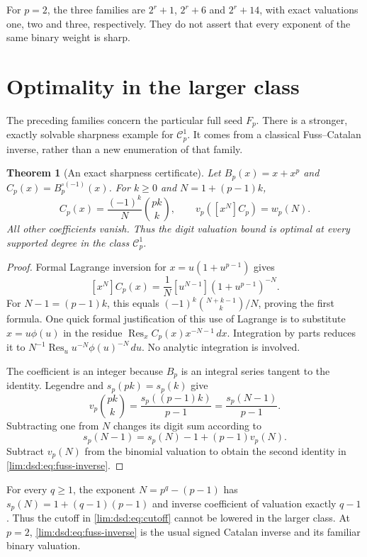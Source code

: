\documentclass[11pt]{article}
\newtheorem{theorem}{Theorem}[section]
\theoremstyle{definition}
\theoremstyle{remark}
\newcommand{\Cp}{\mathcal C_p}
\begin{document}
For $p=2$, the three families are $2^r+1$, $2^r+6$ and $2^r+14$,
with exact valuations one, two and three, respectively. They do not
assert that every exponent of the same binary weight is sharp.

\section{Optimality in the larger class}
\label{lim:dsd:sec:sharpness}

The preceding families concern the particular full seed $F_p$.
There is a stronger, exactly solvable sharpness example for $\Cp^1$.
It comes from a classical Fuss--Catalan inverse, rather than a new
enumeration of that family.

\begin{theorem}[An exact sharpness certificate]
\label{lim:dsd:thm:inverse-sharp}
Let $B_p(x)=x+x^p$ and $C_p(x)=B_p^{\circ(-1)}(x)$. For
$k\ge0$ and $N=1+(p-1)k$,
\begin{equation}
 [x^N]C_p(x)=\frac{(-1)^k}{N}\binom{pk}{k},
 \qquad
 v_p([x^N]C_p)=w_p(N).
 \label{lim:dsd:eq:fuss-inverse}
\end{equation}
All other coefficients vanish. Thus the digit valuation bound is
optimal at every supported degree in the class $\Cp^1$.
\end{theorem}
\begin{proof}
Formal Lagrange inversion \cite{FlajoletSedgewick} for $x=u(1+u^{p-1})$ gives
\[
 [x^N]C_p(x)=\frac1N[u^{N-1}](1+u^{p-1})^{-N}.
\]
For $N-1=(p-1)k$, this equals
$(-1)^k\binom{N+k-1}{k}/N$, proving the first formula.
One quick formal justification of this use of Lagrange is to
substitute $x=u\phi(u)$ in the residue
$\operatorname{Res}_x C_p(x)x^{-N-1}\,dx$. Integration by parts
reduces it to $N^{-1}\operatorname{Res}_u u^{-N}\phi(u)^{-N}\,du$.
No analytic integration is involved.

The coefficient is an integer because $B_p$ is an integral series
tangent to the identity. Legendre and $s_p(pk)=s_p(k)$ give
\[
 v_p\binom{pk}{k}=\frac{s_p((p-1)k)}{p-1}
 =\frac{s_p(N-1)}{p-1}.
\]
Subtracting one from $N$ changes its digit sum according to
\[
 s_p(N-1)=s_p(N)-1+(p-1)v_p(N).
\]
Subtract $v_p(N)$ from the binomial valuation to obtain the
second identity in \eqref{lim:dsd:eq:fuss-inverse}.
\end{proof}

For every $q\ge1$, the exponent $N=p^q-(p-1)$ has
$s_p(N)=1+(q-1)(p-1)$ and inverse coefficient of valuation exactly
$q-1$. Thus the cutoff in \eqref{lim:dsd:eq:cutoff} cannot be lowered in
the larger class. At $p=2$, \eqref{lim:dsd:eq:fuss-inverse} is the usual
signed Catalan inverse and its familiar binary valuation.
\end{document}
